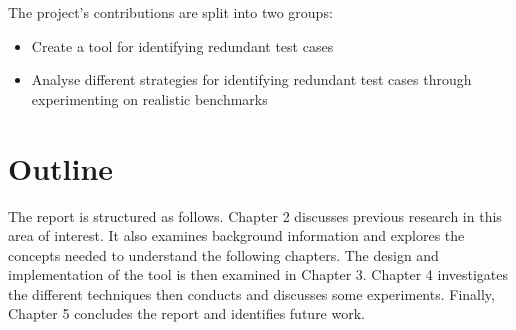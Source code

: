 The project's contributions are split into two groups: 

\begin{itemize}
\item Create a tool for identifying redundant test cases
\item Analyse different strategies for identifying redundant test cases through experimenting on realistic benchmarks
\end{itemize}

\section{Outline}

The report is structured as follows. Chapter 2 discusses previous research in this area of interest. It also examines background information and explores the concepts needed to understand the following chapters. The design and implementation of the tool is then examined in Chapter 3. Chapter 4 investigates the different techniques then conducts and discusses some experiments. Finally, Chapter 5 concludes the report and identifies future work.